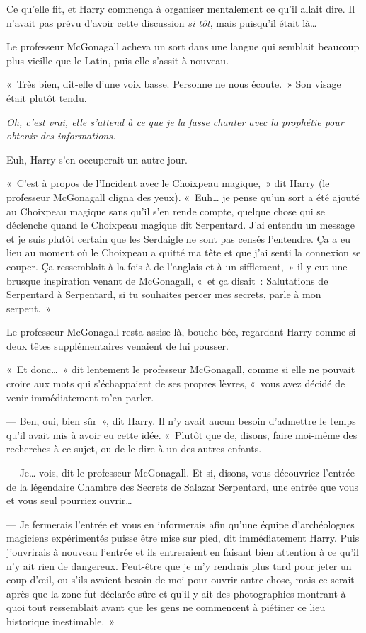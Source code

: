 Ce qu'elle fit, et Harry commença à organiser mentalement ce qu'il allait dire. Il n'avait pas prévu d'avoir cette discussion \emph{si tôt}, mais puisqu'il était là…

Le professeur McGonagall acheva un sort dans une langue qui semblait beaucoup plus vieille que le Latin, puis elle s'assit à nouveau.

«~Très bien, dit-elle d'une voix basse. Personne ne nous écoute.~» Son visage était plutôt tendu.

\emph{Oh, c'est vrai, elle s'attend à ce que je la fasse chanter avec la prophétie pour obtenir des informations.}

Euh, Harry s'en occuperait un autre jour.

«~C'est à propos de l'Incident avec le Choixpeau magique,~» dit Harry (le professeur McGonagall cligna des yeux). «~Euh… je pense qu'un sort a été ajouté au Choixpeau magique sans qu'il s'en rende compte, quelque chose qui se déclenche quand le Choixpeau magique dit Serpentard. J'ai entendu un message et je suis plutôt certain que les Serdaigle ne sont pas censés l'entendre. Ça a eu lieu au moment où le Choixpeau a quitté ma tête et que j'ai senti la connexion se couper. Ça ressemblait à la fois à de l'anglais et à un sifflement,~» il y eut une brusque inspiration venant de McGonagall, «~et ça disait~: Salutations de Serpentard à Serpentard, si tu souhaites percer mes secrets, parle à mon serpent.~»

Le professeur McGonagall resta assise là, bouche bée, regardant Harry comme si deux têtes supplémentaires venaient de lui pousser.

«~Et donc…~» dit lentement le professeur McGonagall, comme si elle ne pouvait croire aux mots qui s'échappaient de ses propres lèvres, «~vous avez décidé de venir immédiatement m'en parler.

--- Ben, oui, bien sûr~», dit Harry. Il n'y avait aucun besoin d'admettre le temps qu'il avait mis à avoir eu cette idée. «~Plutôt que de, disons, faire moi-même des recherches à ce sujet, ou de le dire à un des autres enfants.

--- Je… vois, dit le professeur McGonagall. Et si, disons, vous découvriez l'entrée de la légendaire Chambre des Secrets de Salazar Serpentard, une entrée que vous et vous seul pourriez ouvrir…

--- Je fermerais l'entrée et vous en informerais afin qu'une équipe d'archéologues magiciens expérimentés puisse être mise sur pied, dit immédiatement Harry. Puis j'ouvrirais à nouveau l'entrée et ils entreraient en faisant bien attention à ce qu'il n'y ait rien de dangereux. Peut-être que je m'y rendrais plus tard pour jeter un coup d'œil, ou s'ils avaient besoin de moi pour ouvrir autre chose, mais ce serait après que la zone fut déclarée sûre et qu'il y ait des photographies montrant à quoi tout ressemblait avant que les gens ne commencent à piétiner ce lieu historique inestimable.~»

